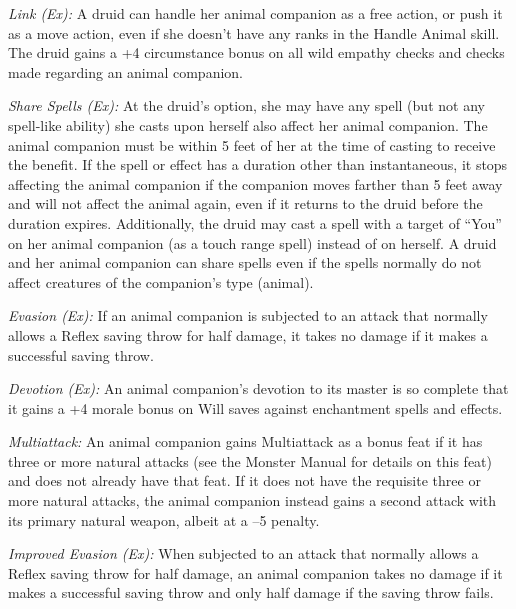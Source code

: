 \textit{Link (Ex):} A druid can handle her animal companion as a free action, or push it as a move action, even if she doesn’t have any ranks in the Handle Animal skill. The druid gains a +4 circumstance bonus on all wild empathy checks and  checks made regarding an animal companion.

\textit{Share Spells (Ex):} At the druid’s option, she may have any spell (but not any spell-like ability) she casts upon herself also affect her animal companion. The animal companion must be within 5 feet of her at the time of casting to receive the benefit. If the spell or effect has a duration other than instantaneous, it stops affecting the animal companion if the companion moves farther than 5 feet away and will not affect the animal again, even if it returns to the druid before the duration expires. Additionally, the druid may cast a spell with a target of “You” on her animal companion (as a touch range spell) instead of on herself. A druid and her animal companion can share spells even if the spells normally do not affect creatures of the companion’s type (animal).

\textit{Evasion (Ex):} If an animal companion is subjected to an attack that normally allows a Reflex saving throw for half damage, it takes no damage if it makes a successful saving throw.

\textit{Devotion (Ex):} An animal companion’s devotion to its master is so complete that it gains a +4 morale bonus on Will saves against enchantment spells and effects.

\textit{Multiattack:} An animal companion gains Multiattack as a bonus feat if it has three or more natural attacks (see the Monster Manual for details on this feat) and does not already have that feat. If it does not have the requisite three or more natural attacks, the animal companion instead gains a second attack with its primary natural weapon, albeit at a –5 penalty.

\textit{Improved Evasion (Ex):} When subjected to an attack that normally allows a Reflex saving throw for half damage, an animal companion takes no damage if it makes a successful saving throw and only half damage if the saving throw fails.